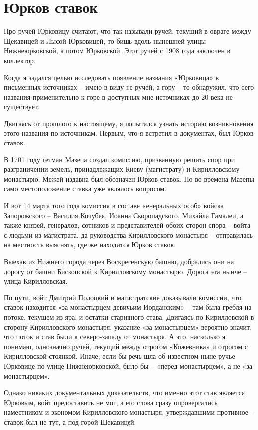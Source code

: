 \chapter{Юрков ставок}

Про ручей Юрковицу считают, что так называли ручей, текущий в овраге между Щекавицей и Лысой-Юрковицей, то бишь вдоль нынешней улицы Нижнеюрковской, а потом Юрковской. Этот ручей с 1908 года заключен в коллектор.

Когда я задался целью исследовать появление названия «Юрковица» в письменных источниках – имею в виду не ручей, а гору – то обнаружил, что сего названия применительно к горе в доступных мне источниках до 20 века не существует.

Двигаясь от прошлого к настоящему, я попытался узнать историю возникновения этого названия по источникам. Первым, что я встретил в документах, был Юрков ставок.

В 1701 году гетман Мазепа создал комиссию, призванную решить спор при разграничении земель, принадлежащих Киеву (магистрату) и Кирилловскому монастырю. Межей издавна был обозначен Юрков ставок. Но во времена Мазепы само местоположение ставка уже являлось вопросом.

И вот 14 марта того года комиссия в составе «енеральных особ» войска Запорожского – Василия Кочубея, Иоанна Скоропадского, Михайла Гамалеи, а также князей, генералов, сотников и представителей обоих сторон спора – войта с людьми из магистрата, да руководства Кирилловского монастыря – отправилась на местность выяснять, где же находится Юрков ставок.

Выехав из Нижнего города через Воскресенскую башню, добрались они на дорогу от башни Бископской к Кирилловскому монастырю. Дорога эта нынче – улица Кирилловская.

По пути, войт Дмитрий Полоцкий и магистратские доказывали комиссии, что ставок находится «за монастырцем девичьим Иорданским» – там была гребля на потоке, текущем из яра, и остатки старинного става. Двигаясь по Кирилловской в сторону Кирилловского монастыря, указание «за монастырцем» вероятно значит, что поток и став были к северо-западу от монастыря. А это, насколько я понимаю, однозначно ручей, текущий между отрогом «Кожевника» и отрогом с Кирилловской стоянкой. Иначе, если бы речь шла об известном ныне ручье Юрковице по улице Нижнеюрковской, было бы – «перед монастырцем», а не «за монастырцем».

Однако никаких документальных доказательств, что именно этот став является Юрковым, войт предоставить не мог, а его слова сразу опровергались наместником и экономом Кирилловского монастыря, утверждавшими противное – ставок был не тут, а под горой Щекавицей.

